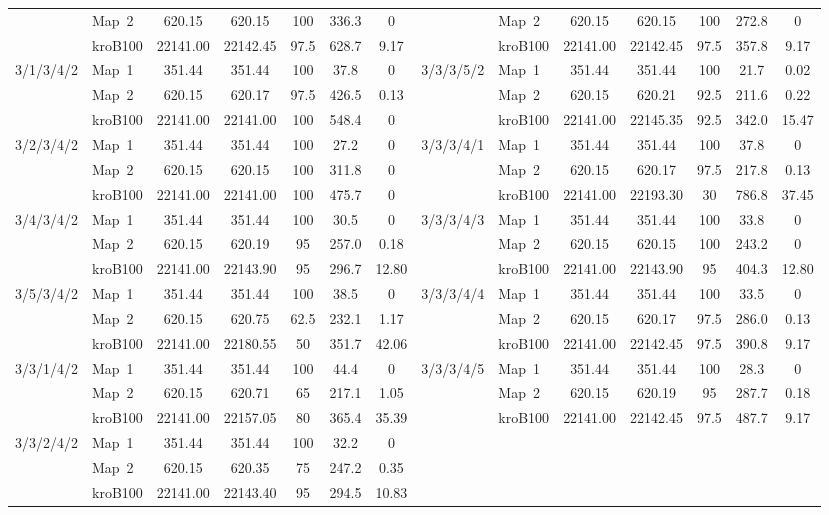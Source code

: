 \documentclass[lettersize,journal]{IEEEtran}
\begin{document}
\begin{table}[!t]
{\begin{tabular}{llccccc|llccccc}
& Map~2 & 620.15 & 620.15 & 100 & 336.3 & 0 & & Map~2 & 620.15 & 620.15 & 100 & 272.8 & 0 \\
& kroB100 & 22141.00 & 22142.45 & 97.5 & 628.7 & 9.17 & & kroB100 & 22141.00 & 22142.45 & 97.5 & 357.8 & 9.17 \\ \cline{2-7}\cline{9-14}
\multirow{3}{*}{3/1/3/4/2} & Map~1 & 351.44 & 351.44 & 100 & 37.8 & 0 & \multirow{3}{*}{3/3/3/5/2} & Map~1 & 351.44 & 351.44 & 100 & 21.7 & 0.02 \\
& Map~2 & 620.15 & 620.17 & 97.5 & 426.5 & 0.13 & & Map~2 & 620.15 & 620.21 & 92.5 & 211.6 & 0.22 \\
& kroB100 & 22141.00 & 22141.00 & 100 & 548.4 & 0 & & kroB100 & 22141.00 & 22145.35 & 92.5 & 342.0 & 15.47 \\ \cline{2-7}\cline{9-14}
\multirow{3}{*}{3/2/3/4/2} & Map~1 & 351.44 & 351.44 & 100 & 27.2 & 0 & \multirow{3}{*}{3/3/3/4/1} & Map~1 & 351.44 & 351.44 & 100 & 37.8 & 0 \\
& Map~2 & 620.15 & 620.15 & 100 & 311.8 & 0 & & Map~2 & 620.15 & 620.17 & 97.5 & 217.8 & 0.13 \\
& kroB100 & 22141.00 & 22141.00 & 100 & 475.7 & 0 & & kroB100 & 22141.00 & 22193.30 & 30 & 786.8 & 37.45 \\ \cline{2-7}\cline{9-14}
\multirow{3}{*}{3/4/3/4/2} & Map~1 & 351.44 & 351.44 & 100 & 30.5 & 0 & \multirow{3}{*}{3/3/3/4/3} & Map~1 & 351.44 & 351.44 & 100 & 33.8 & 0 \\
& Map~2 & 620.15 & 620.19 & 95 & 257.0 & 0.18 & & Map~2 & 620.15 & 620.15 & 100 & 243.2 & 0 \\
& kroB100 & 22141.00 & 22143.90 & 95 & 296.7 & 12.80 & & kroB100 & 22141.00 & 22143.90 & 95 & 404.3 & 12.80 \\ \cline{2-7}\cline{9-14}
\multirow{3}{*}{3/5/3/4/2} & Map~1 & 351.44 & 351.44 & 100 & 38.5 & 0 & \multirow{3}{*}{3/3/3/4/4} & Map~1 & 351.44 & 351.44 & 100 & 33.5 & 0 \\
& Map~2 & 620.15 & 620.75 & 62.5 & 232.1 & 1.17 & & Map~2 & 620.15 & 620.17 & 97.5 & 286.0 & 0.13 \\
& kroB100 & 22141.00 & 22180.55 & 50 & 351.7 & 42.06 & & kroB100 & 22141.00 & 22142.45 & 97.5 & 390.8 & 9.17 \\ \cline{2-7}\cline{9-14}
\multirow{3}{*}{3/3/1/4/2} & Map~1 & 351.44 & 351.44 & 100 & 44.4 & 0 & \multirow{3}{*}{3/3/3/4/5} & Map~1 & 351.44 & 351.44 & 100 & 28.3 & 0 \\
& Map~2 & 620.15 & 620.71 & 65 & 217.1 & 1.05 & & Map~2 & 620.15 & 620.19 & 95 & 287.7 & 0.18 \\
& kroB100 & 22141.00 & 22157.05 & 80 & 365.4 & 35.39 & & kroB100 & 22141.00 & 22142.45 & 97.5 & 487.7 & 9.17 \\ \cline{2-7}
\multirow{3}{*}{3/3/2/4/2} & Map~1 & 351.44 & 351.44 & 100 & 32.2 & 0 & & & & & & & \\
& Map~2 & 620.15 & 620.35 & 75 & 247.2 & 0.35 & & & & & & & \\
& kroB100 & 22141.00 & 22143.40 & 95 & 294.5 & 10.83 & & & & & & & \\
\toprule
\end{tabular}
}
\end{table}
\end{document}
